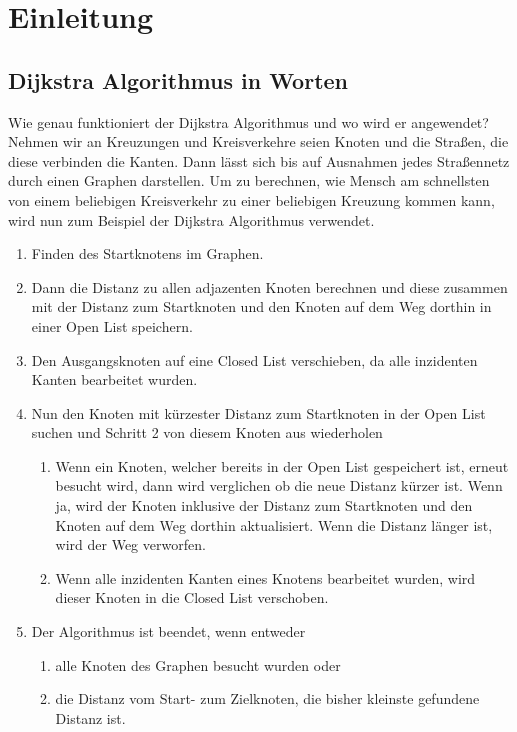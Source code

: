 \documentclass[a4paper]{article}
\begin{document}
	

\newpage

\tableofcontents

\newpage

\section{Einleitung}

\subsection{Dijkstra Algorithmus in Worten}

Wie genau funktioniert der Dijkstra Algorithmus und wo wird er angewendet?
Nehmen wir an Kreuzungen und Kreisverkehre seien Knoten und die Straßen, die diese verbinden die Kanten. Dann lässt sich bis auf Ausnahmen jedes Straßennetz durch einen Graphen darstellen. Um zu berechnen, wie Mensch am schnellsten von einem beliebigen Kreisverkehr zu einer beliebigen Kreuzung kommen kann, wird nun zum Beispiel der Dijkstra Algorithmus verwendet.

\begin{enumerate}
    \item Finden des Startknotens im Graphen.
    \item Dann die Distanz zu allen adjazenten Knoten berechnen und diese zusammen mit der Distanz zum Startknoten und den Knoten auf dem Weg dorthin in einer Open List speichern. 
    \item Den Ausgangsknoten auf eine Closed List verschieben, da alle inzidenten Kanten bearbeitet wurden.
    
    \item Nun den Knoten mit kürzester Distanz zum Startknoten in der Open List suchen und Schritt 2 von diesem Knoten aus wiederholen
    \begin{enumerate}
        \item Wenn ein Knoten, welcher bereits in der Open List gespeichert ist, erneut besucht wird, dann wird verglichen ob die neue Distanz kürzer ist. Wenn ja, wird der Knoten inklusive der Distanz zum Startknoten und den Knoten auf dem Weg dorthin aktualisiert. Wenn die Distanz länger ist, wird der Weg verworfen.
        \item Wenn alle inzidenten Kanten eines Knotens bearbeitet wurden, wird dieser Knoten in die Closed List verschoben.
    \end{enumerate}

    \item Der Algorithmus ist beendet, wenn entweder
    \begin{enumerate}
        \item alle Knoten des Graphen besucht wurden oder
        \item die Distanz vom Start- zum Zielknoten, die bisher kleinste gefundene Distanz ist.
    \end{enumerate}
\end{enumerate}
\end{document}
